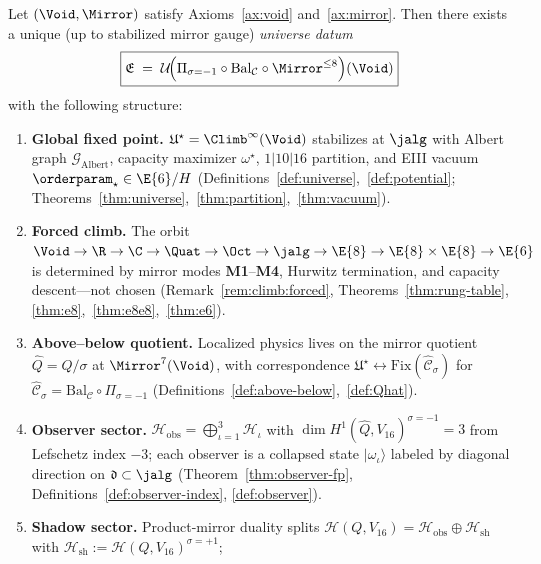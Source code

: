 \begin{theorem}\label{thm:universe-summary}
Let $(\Void,\Mirror)$ satisfy Axioms~\ref{ax:void} and~\ref{ax:mirror}. Then
there exists a unique (up to stabilized mirror gauge) \emph{universe datum}
\begin{equation}\label{eq:universe-summary}
  \boxed{%
  \mathfrak{E}
  \;=\;
  \mathcal{U}\!\Bigl(
    \Pi_{\sigma=-1}\circ\mathrm{Bal}_{\mathcal{C}}\circ\Mirror^{\leq 8}
  \Bigr)(\Void)}
\end{equation}
with the following structure:
\begin{enumerate}[label=(\roman*),leftmargin=*]
  \item \textbf{Global fixed point.}
    $\mathfrak{U}^\star=\Climb^\infty(\Void)$ stabilizes at $\jalg$ with Albert
    graph $\mathcal{G}_{\mathrm{Albert}}$, capacity maximizer $\omega^\star$,
    $1|10|16$ partition, and EIII vacuum $\orderparam_\star\in\E{6}/H$
    (Definitions~\ref{def:universe},~\ref{def:potential};
    Theorems~\ref{thm:universe},~\ref{thm:partition},~\ref{thm:vacuum}).
  \item \textbf{Forced climb.}
    The orbit
    $\Void\to\R\to\C\to\Quat\to\Oct\to\jalg\to\E{8}\to\E{8}\times\E{8}\to\E{6}$
    is determined by mirror modes \textbf{M1}--\textbf{M4}, Hurwitz
    termination, and capacity descent---not chosen
    (Remark~\ref{rem:climb:forced}, Theorems~\ref{thm:rung-table},
    \ref{thm:e8},~\ref{thm:e8e8},~\ref{thm:e6}).
  \item \textbf{Above--below quotient.}
    Localized physics lives on the mirror quotient
    $\hat Q=Q/\sigma$ at $\Mirror^7(\Void)$, with correspondence
    $\mathfrak{U}^\star\longleftrightarrow\mathrm{Fix}(\hat{\mathcal{C}}_\sigma)$
    for $\hat{\mathcal{C}}_\sigma=\mathrm{Bal}_{\mathcal{C}}\circ\Pi_{\sigma=-1}$
    (Definitions~\ref{def:above-below},~\ref{def:Qhat}).
  \item \textbf{Observer sector.}
    $\mathcal{H}_{\mathrm{obs}}=\bigoplus_{\iota=1}^3\mathcal{H}_\iota$ with
    $\dim H^1(\hat Q,V_{16})^{\sigma=-1}=3$ from Lefschetz index $-3$; each
    observer is a collapsed state $|\omega_\iota\rangle$ labeled by diagonal
    direction on $\mathfrak{d}\subset\jalg$
    (Theorem~\ref{thm:observer-fp}, Definitions~\ref{def:observer-index},
    \ref{def:observer}).
  \item \textbf{Shadow sector.}
    Product-mirror duality splits
    $\mathcal{H}(Q,V_{16})=\mathcal{H}_{\mathrm{obs}}\oplus\mathcal{H}_{\mathrm{sh}}$
    with $\mathcal{H}_{\mathrm{sh}}:=\mathcal{H}(Q,V_{16})^{\sigma=+1}$;

\end{enumerate}
\end{theorem}
